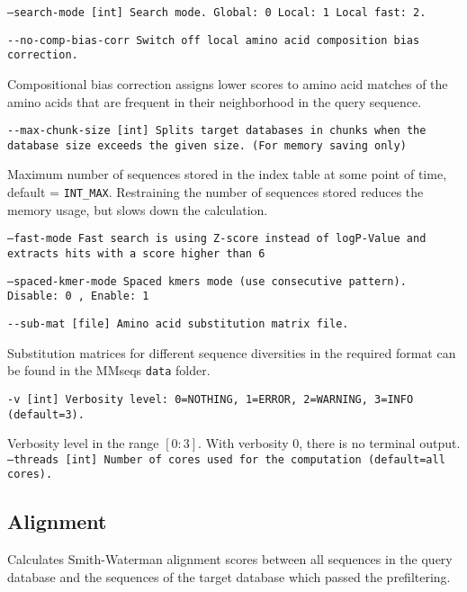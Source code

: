 \documentclass[11pt,a4paper]{report}
\begin{document}
\texttt{\small --search-mode {[}int{]}  Search mode. Global: 0 Local: 1 Local fast: 2.}{\small \par}

\texttt{\small -{}-no-comp-bias-corr Switch off local amino acid composition
bias correction.}{\small \par}

Compositional bias correction assigns lower scores to amino acid matches
of the amino acids that are frequent in their neighborhood in the
query sequence.

\texttt{\small -{}-max-chunk-size {[}int{]} Splits target databases
in chunks when the database size exceeds the given size. (For memory
saving only)}{\small \par}

Maximum number of sequences stored in the index table at some point
of time, default = \texttt{INT\_MAX}. Restraining the number of sequences
stored reduces the memory usage, but slows down the calculation.

\texttt{\small --fast-mode Fast search is using Z-score instead of logP-Value and extracts hits with a score higher than 6}{\small \par}
 


\texttt{\small --spaced-kmer-mode       Spaced kmers mode (use consecutive pattern). Disable: 0             , Enable: 1}{\small \par}


\texttt{\small -{}-sub-mat {[}file{]} Amino acid substitution matrix
file.}{\small \par}

Substitution matrices for different sequence diversities in the required
format can be found in the MMseqs \texttt{data} folder.

\texttt{\small -v {[}int{]} Verbosity level: 0=NOTHING, 1=ERROR, 2=WARNING,
3=INFO (default=3).}{\small \par}

Verbosity level in the range $[0:3]$. With verbosity $0$, there
is no terminal output.
\texttt{\small --threads {[}int{]} Number of cores used for the computation
(default=all cores).}{\small \par}


\subsection{Alignment}

Calculates Smith-Waterman alignment scores between all sequences in
the query database and the sequences of the target database which
passed the prefiltering.
\end{document}
